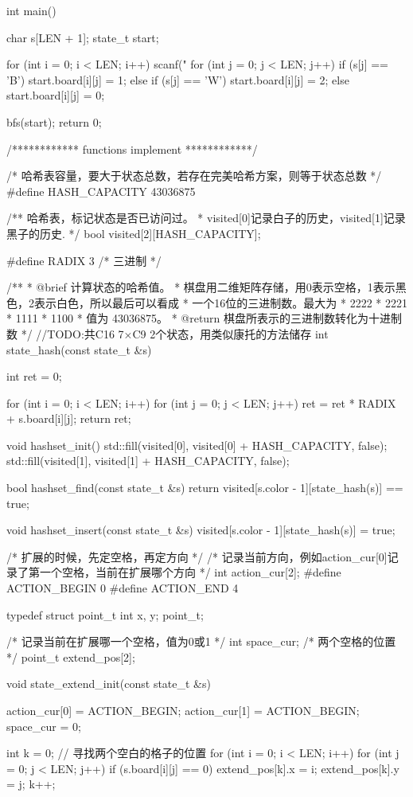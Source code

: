 \begin{Codex}[label=four_adjacent.cpp]
int main() {
    char s[LEN + 1];
    state_t start;

    for (int i = 0; i < LEN; i++) {
        scanf("%
        for (int j = 0; j < LEN; j++) {
            if (s[j] == 'B') start.board[i][j] = 1;
            else if (s[j] == 'W') start.board[i][j] = 2;
            else start.board[i][j] = 0;
        }
    }

    bfs(start);
    return 0;
}

/************ functions implement ************/

/* 哈希表容量，要大于状态总数，若存在完美哈希方案，则等于状态总数 */
#define HASH_CAPACITY 43036875

/** 哈希表，标记状态是否已访问过。
 * visited[0]记录白子的历史，visited[1]记录黑子的历史.
 */
bool visited[2][HASH_CAPACITY];

#define RADIX 3 /* 三进制 */

/**
 * @brief 计算状态的哈希值。
 * 棋盘用二维矩阵存储，用0表示空格，1表示黑色，2表示白色，所以最后可以看成
 * 一个16位的三进制数。最大为
 * 2222
 * 2221
 * 1111
 * 1100
 * 值为 43036875。
 * @return 棋盘所表示的三进制数转化为十进制数
 */
//TODO:共C16 7×C9 2个状态，用类似康托的方法储存
int state_hash(const state_t &s) {
    int ret = 0;

    for (int i = 0; i < LEN; i++) {
        for (int j = 0; j < LEN; j++) {
            ret = ret * RADIX + s.board[i][j];
        }
    }
    return ret;
}

void hashset_init() {
    std::fill(visited[0], visited[0] + HASH_CAPACITY, false);
    std::fill(visited[1], visited[1] + HASH_CAPACITY, false);
}

bool hashset_find(const state_t &s) {
    return visited[s.color - 1][state_hash(s)] == true;
}

void hashset_insert(const state_t &s) {
    visited[s.color - 1][state_hash(s)] = true;
}

/* 扩展的时候，先定空格，再定方向 */
/* 记录当前方向，例如action_cur[0]记录了第一个空格，当前在扩展哪个方向
 */
int action_cur[2];
#define ACTION_BEGIN 0
#define ACTION_END 4

typedef struct point_t {
    int x, y;
} point_t;

/* 记录当前在扩展哪一个空格，值为0或1 */
int space_cur;
/* 两个空格的位置 */
point_t extend_pos[2];

void state_extend_init(const state_t &s) {
    action_cur[0] = ACTION_BEGIN;
    action_cur[1] = ACTION_BEGIN;
    space_cur = 0;

    int k = 0;
    // 寻找两个空白的格子的位置
    for (int i = 0; i < LEN; i++) {
        for (int j = 0; j < LEN; j++) {
            if (s.board[i][j] == 0) {
                extend_pos[k].x = i;
                extend_pos[k].y = j;
                k++;
            }
        }
    }
}


\end{Codex}
